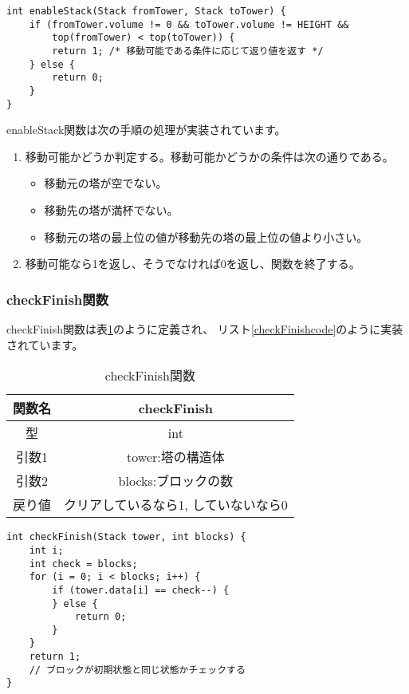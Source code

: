 \documentclass[a4j]{jarticle}
\begin{document}
\begin{lstlisting}[caption=enableStack関数,label=enableStackcode]
  int enableStack(Stack fromTower, Stack toTower) {
    if (fromTower.volume != 0 && toTower.volume != HEIGHT &&
        top(fromTower) < top(toTower)) {
        return 1; /* 移動可能である条件に応じて返り値を返す */
    } else {
        return 0;
    }
}
\end{lstlisting}

enableStack関数は次の手順の処理が実装されています。
\begin{enumerate}
  \item 移動可能かどうか判定する。移動可能かどうかの条件は次の通りである。
        \begin{itemize}
          \item 移動元の塔が空でない。
          \item 移動先の塔が満杯でない。
          \item 移動元の塔の最上位の値が移動先の塔の最上位の値より小さい。
        \end{itemize}
  \item 移動可能なら1を返し、そうでなければ0を返し、関数を終了する。
\end{enumerate}

\subsubsection{checkFinish関数}
checkFinish関数は表\ref{tb:checkFinish}のように定義され、
リスト\ref{checkFinishcode}のように実装されています。

\begin{table}[h]
  \centering
  \caption{checkFinish関数}
  \label{tb:checkFinish}
  \begin{tabular}{|c|c|}
    \hline
    関数名 & checkFinish          \\
    \hline
    型   & int                  \\
    \hline
    引数1 & tower:塔の構造体          \\
    \hline
    引数2 & blocks:ブロックの数        \\
    \hline
    戻り値 & クリアしているなら1, していないなら0 \\
    \hline
  \end{tabular}
\end{table}

\begin{lstlisting}[caption=checkFinish関数,label=checkFinishcode]
  int checkFinish(Stack tower, int blocks) {
    int i;
    int check = blocks;
    for (i = 0; i < blocks; i++) {
        if (tower.data[i] == check--) {
        } else {
            return 0;
        }
    }
    return 1;
    // ブロックが初期状態と同じ状態かチェックする
}
\end{lstlisting}
\end{document}
